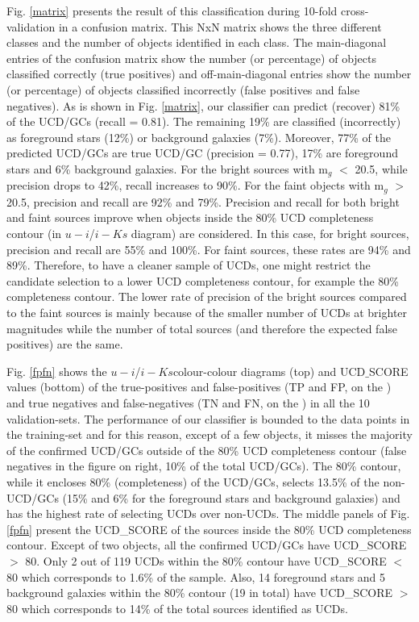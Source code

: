 \documentclass[fleqn,usenatbib]{mnras}
\begin{document}
Fig. \ref{matrix} presents the result of this classification during 10-fold cross-validation in a confusion matrix. This NxN matrix shows the three different classes and the number of objects identified in each class. The main-diagonal entries of the confusion matrix show the number (or percentage) of objects classified correctly (true positives) and off-main-diagonal entries show the number (or percentage) of objects classified incorrectly (false positives and false negatives). As is shown in Fig. \ref{matrix}, our classifier can predict (recover) 81\% of the UCD/GCs (recall = 0.81). The remaining 19\% are classified (incorrectly) as foreground stars (12\%) or background galaxies (7\%). Moreover, 77\% of the predicted UCD/GCs are true UCD/GC (precision = 0.77), 17\% are foreground stars and 6\% background galaxies. For the bright sources with m$_g$ $<$ 20.5, while precision drops to 42\%, recall increases to 90\%. For the faint objects with m$_g$ $>$ 20.5, precision and recall are 92\% and 79\%. Precision and recall for both bright and faint sources improve when objects inside the 80\% UCD completeness contour (in $u-i$/$i-Ks$ diagram) are considered. In this case, for bright sources, precision and recall are 55\% and 100\%. For faint sources, these rates are 94\% and 89\%. Therefore, to have a cleaner sample of UCDs, one might restrict the candidate selection to a lower UCD completeness contour, for example the 80\% completeness contour. The lower rate of precision of the bright sources compared to the faint sources is mainly because of the smaller number of UCDs at brighter magnitudes while the number of total sources (and therefore the expected false positives) are the same.

Fig. \ref{fpfn} shows the $u-i$/$i-Ks$colour-colour diagrams (top) and UCD$\_$SCORE values (bottom) of the true-positives and false-positives (TP and FP, on the ) and true negatives and false-negatives (TN and FN, on the ) in all the 10 validation-sets. The performance of our classifier is bounded to the data points in the training-set and for this reason, except of a few objects, it misses the majority of the confirmed UCD/GCs outside of the 80\% UCD completeness contour (false negatives in the figure on right, 10\% of the total UCD/GCs). The 80\% contour, while it encloses 80\% (completeness) of the UCD/GCs, selects 13.5\% of the non-UCD/GCs (15\% and 6\% for the foreground stars and background galaxies) and has the highest rate of selecting UCDs over non-UCDs. The middle panels of Fig. \ref{fpfn} present the UCD\_SCORE of the sources inside the 80\% UCD completeness contour. Except of two objects, all the confirmed UCD/GCs have UCD\_SCORE $>$ 80. Only 2 out of 119 UCDs within the 80\% contour have UCD\_SCORE $<$ 80 which corresponds to 1.6\% of the sample. Also, 14 foreground stars and 5 background galaxies within the 80\% contour (19 in total) have UCD\_SCORE $>$ 80 which corresponds to 14\% of the total sources identified as UCDs.
\end{document}
